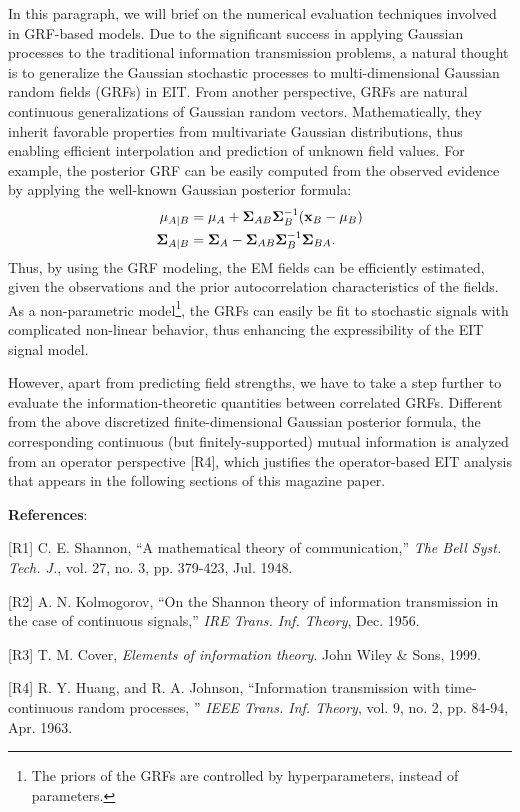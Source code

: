 \documentclass[a4paper,12pt]{article}
\begin{document}
{     In this paragraph, we will brief on the numerical evaluation techniques involved in GRF-based models. Due to the significant success in applying Gaussian processes to the traditional information transmission problems, a natural thought is to generalize the Gaussian stochastic processes to multi-dimensional Gaussian random fields (GRFs) in EIT. From another perspective, GRFs are natural continuous generalizations of Gaussian random vectors. Mathematically, they inherit favorable properties from multivariate Gaussian distributions, thus enabling efficient interpolation and prediction of unknown field values. For example, the posterior GRF can be easily computed from the observed evidence by applying the well-known Gaussian posterior formula:
    \begin{equation}
        \begin{aligned}
            {\bf \mu}_{A|B} &= {\bf \mu}_A + {\bf \Sigma}_{AB}{\bf \Sigma}_B^{-1}({\bf x}_B-{\bf \mu}_B) \\
            {\bf \Sigma}_{A|B}&={\bf \Sigma}_A - {\bf \Sigma}_{AB}{\bf \Sigma}_B^{-1}{\bf \Sigma}_{BA}.
        \end{aligned}
    \end{equation}
    Thus, by using the GRF modeling, the EM fields can be efficiently estimated, given the observations and the prior autocorrelation characteristics of the fields. As a non-parametric model\footnote{The priors of the GRFs are controlled by hyperparameters, instead of parameters. }, the GRFs can easily be fit to stochastic signals with complicated non-linear behavior, thus enhancing the expressibility of the EIT signal model. 
    
    \quad However, apart from predicting field strengths, we have to take a step further to evaluate the information-theoretic quantities between correlated GRFs. Different from the above discretized finite-dimensional Gaussian posterior formula, the corresponding continuous (but finitely-supported) mutual information is analyzed from an operator perspective [R4], which justifies the operator-based EIT analysis that appears in the following sections of this magazine paper.  
    
    {\bf References}:

    [R1] C. E. Shannon, ``A mathematical theory of communication,'' {\it The Bell Syst. Tech. J.}, vol. 27, no. 3, pp. 379-423, Jul. 1948. 

    [R2] A. N. Kolmogorov, ``On the Shannon theory of information transmission in the case of continuous signals,'' {\it IRE Trans. Inf. Theory}, Dec. 1956. 

    [R3] T. M. Cover, {\it Elements of information theory}. John Wiley \& Sons, 1999. 

    [R4] R. Y. Huang, and R. A. Johnson, ``Information transmission with time-continuous random processes, '' {\it IEEE Trans. Inf. Theory}, vol. 9, no. 2, pp. 84-94, Apr. 1963. 

}
\end{document}
